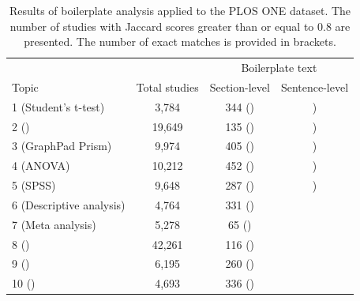 \documentclass[12pt]{article}
\begin{document}
\begin{table}[htbp]
\centering
\caption{Results of boilerplate analysis applied to the PLOS ONE dataset. The number of studies with Jaccard scores greater than or equal to 0.8 are presented. The number of exact matches is provided in brackets.}
\label{tab:plosr-boilerplate-matches}
\begin{tabular}{lccc}
\hline
 &  & \multicolumn{2}{c}{Boilerplate text} \\
\cline{3-4}
Topic & Total studies & Section-level & {Sentence-level}\\
\hline
1 (Student's t-test) & 3,784 & 344 () & )\\
2 () & 19,649 & 135 () &)\\
3 (GraphPad Prism) & 9,974 & 405 () &)\\
4 (ANOVA) & 10,212 & 452 () &)\\
5 (SPSS) & 9,648 & 287 () &)\\
6 (Descriptive analysis) & 4,764 & 331 () & \\
7 (Meta analysis) & 5,278&  65 () & \\
8 () & 42,261 &  116 () & \\
9 () & 6,195 & 260 () & \\
10 () & 4,693 & 336 () & \\
\hline
\end{tabular}
\end{table}
\end{document}
